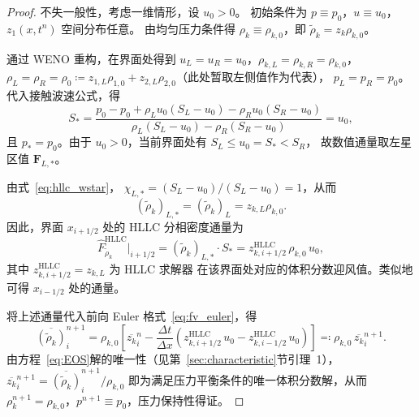 \documentclass[12pt,a4paper]{article}
\numberwithin{equation}{section}    %
\begin{document}
\begin{proof}
不失一般性，考虑一维情形，设 $u_0 > 0$。
初始条件为 $p \equiv p_0$，$u \equiv u_0$，
$z_1(x, t^n)$ 空间分布任意。
由均匀压力条件得 $\rho_k \equiv \rho_{k,0}$，即
$\tilde{\rho}_k = z_k \rho_{k,0}$。

通过 WENO 重构，在界面处得到
$u_L = u_R = u_0$，$\rho_{k,L} = \rho_{k,R} = \rho_{k,0}$，
$\rho_L = \rho_R = \rho_0 \coloneqq z_{1,L}\rho_{1,0} + z_{2,L}\rho_{2,0}$（此处暂取左侧值作为代表），
$p_L = p_R = p_0$。
代入接触波速公式，得
\begin{equation}
    S_* = \frac{p_0 - p_0 + \rho_L u_0(S_L - u_0) - \rho_R u_0(S_R - u_0)}
    {\rho_L(S_L - u_0) - \rho_R(S_R - u_0)} = u_0,
\end{equation}
且 $p_* = p_0$。由于 $u_0 > 0$，当前界面处有 $S_L \leqslant u_0 = S_* < S_R$，
故数值通量取左星区值 $\bm{F}_{L,*}$。

由式~\eqref{eq:hllc_wstar}，
$\chi_{L,*} = (S_L - u_0)/(S_L - u_0) = 1$，从而
\begin{equation}
    (\tilde{\rho}_k)_{L,*} = (\tilde{\rho}_k)_L = z_{k,L}\rho_{k,0}.
\end{equation}
因此，界面 $x_{i+1/2}$ 处的 HLLC 分相密度通量为
\begin{equation}
    \hat{F}^{\mathrm{HLLC}}_{\tilde{\rho}_k}\big|_{i+1/2}
    = (\tilde{\rho}_k)_{L,*} \cdot S_*
    = z_{k,i+1/2}^{\mathrm{HLLC}}\,\rho_{k,0}\,u_0,
\end{equation}
其中 $z_{k,i+1/2}^{\mathrm{HLLC}} = z_{k,L}$ 为 HLLC 求解器
在该界面处对应的体积分数迎风值。类似地可得 $x_{i-1/2}$ 处的通量。

将上述通量代入前向 Euler 格式~\eqref{eq:fv_euler}，得
\begin{equation}
    \overline{(\tilde{\rho}_k)}_i^{n+1}
    = \rho_{k,0}\left[
        \overline{z_k}_i^n
        - \frac{\Delta t}{\Delta x}
        \left(
            z_{k,i+1/2}^{\mathrm{HLLC}}\,u_0
            - z_{k,i-1/2}^{\mathrm{HLLC}}\,u_0
        \right)
    \right]
    \eqqcolon \rho_{k,0}\,\overline{z_k}_i^{n+1}.
\end{equation}
由方程~\eqref{eq:EOS}解的唯一性（见第~\autoref{sec:characteristic}节引理~1），
$\overline{z_k}_i^{n+1} = \overline{(\tilde{\rho}_k)}_i^{n+1}/\rho_{k,0}$
即为满足压力平衡条件的唯一体积分数解，从而
$\rho_k^{n+1} = \rho_{k,0}$，$p^{n+1} \equiv p_0$，压力保持性得证。


\end{proof}
\end{document}
